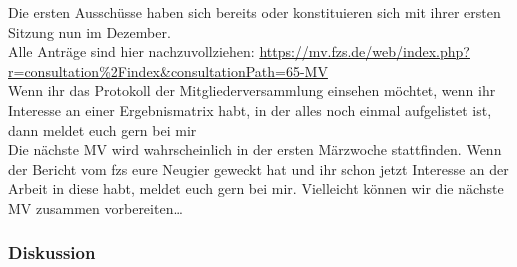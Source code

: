 Die ersten Ausschüsse haben sich bereits oder konstituieren sich mit ihrer ersten Sitzung nun im Dezember.\\
Alle Anträge sind hier nachzuvollziehen: \url{https://mv.fzs.de/web/index.php?r=consultation%2Findex&consultationPath=65-MV}\\
Wenn ihr das Protokoll der Mitgliederversammlung einsehen möchtet, wenn ihr Interesse an einer Ergebnismatrix habt, in der alles noch einmal aufgelistet ist, dann meldet euch gern bei mir\\
Die nächste MV wird wahrscheinlich in der ersten Märzwoche stattfinden. Wenn der Bericht vom fzs eure Neugier geweckt hat und ihr schon jetzt Interesse an der Arbeit in diese habt, meldet euch gern bei mir. Vielleicht können wir die nächste MV zusammen vorbereiten…
\subsubsection{Diskussion}
\ul{
}

